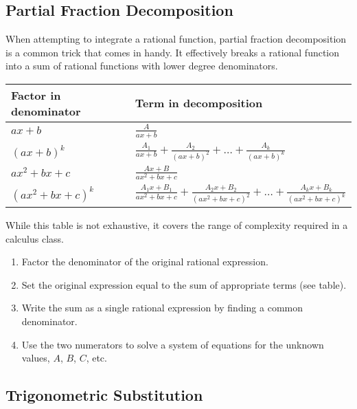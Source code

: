 \subsection{Partial Fraction Decomposition}

When attempting to integrate a rational function, partial fraction decomposition is a common trick that comes in handy. It effectively breaks a rational function into a sum of rational functions with lower degree denominators.



\begin{center}
\def\arraystretch{1.5}
\begin{tabular}{@{}ll@{}}
\toprule[0.4mm]
      Factor in denominator & Term in decomposition\\
      \hline
      $ax+b$          & $\frac{A}{ax+b}$ \\
      $(ax+b)^k$      & $\frac{A_1}{ax+b}+\frac{A_2}{(ax+b)^2}+\dots+\frac{A_k}{(ax+b)^k}$ \\
      $ax^2+bx+c$     & $\frac{Ax+B}{ax^2+bx+c}$\\
      $(ax^2+bx+c)^k$ & $\frac{A_1x+B_1}{ax^2+bx+c}+\frac{A_2x+B_2}{(ax^2+bx+c)^2}+\dots+\frac{A_kx+B_k}{(ax^2+bx+c)^k}$ \\
\bottomrule[0.4mm]
    \end{tabular}
\end{center}


While this table is not exhaustive, it covers the range of complexity required in a calculus class.

\begin{strat}
\begin{enumerate}[leftmargin=1em]
  \item Factor the denominator of the original rational expression.
  \item Set the original expression equal to the sum of appropriate terms (see table).
  \item Write the sum as a single rational expression by finding a common denominator.
  \item Use the two numerators to solve a system of equations for the unknown values, $A$, $B$, $C$, etc.
\end{enumerate}
\end{strat}



\subsection{Trigonometric Substitution}

